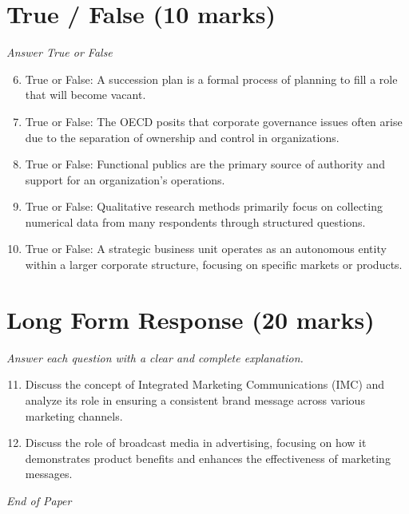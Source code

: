 \documentclass[12pt]{article}
\begin{document}
\section*{True / False (10 marks)}
\textit{Answer True or False}
\begin{enumerate}[label=\arabic*.]
\setcounter{enumi}{5}
\item True or False: A succession plan is a formal process of planning to fill a role that will become vacant.
\item True or False: The OECD posits that corporate governance issues often arise due to the separation of ownership and control in organizations.
\item True or False: Functional publics are the primary source of authority and support for an organization's operations.
\item True or False: Qualitative research methods primarily focus on collecting numerical data from many respondents through structured questions.
\item True or False: A strategic business unit operates as an autonomous entity within a larger corporate structure, focusing on specific markets or products.
\end{enumerate}

\section*{Long Form Response (20 marks)}
\textit{Answer each question with a clear and complete explanation.}
\begin{enumerate}[label=\arabic*.]
\setcounter{enumi}{10}
\item Discuss the concept of Integrated Marketing Communications (IMC) and analyze its role in ensuring a consistent brand message across various marketing channels.
\item Discuss the role of broadcast media in advertising, focusing on how it demonstrates product benefits and enhances the effectiveness of marketing messages.
\end{enumerate}

\vfill
\noindent\textit{End of Paper}
\end{document}
